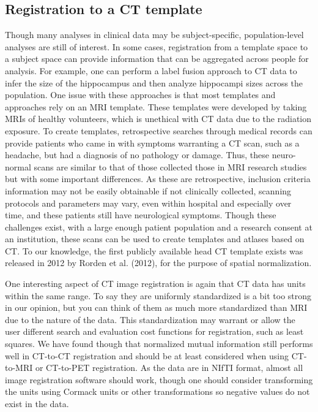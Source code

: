 \documentclass[]{elsarticle} %
\begin{document}
\hypertarget{registration-to-a-ct-template}{%
\subsection{Registration to a CT
template}\label{registration-to-a-ct-template}}

Though many analyses in clinical data may be subject-specific,
population-level analyses are still of interest. In some cases,
registration from a template space to a subject space can provide
information that can be aggregated across people for analysis. For
example, one can perform a label fusion approach to CT data to infer the
size of the hippocampus and then analyze hippocampi sizes across the
population. One issue with these approaches is that most templates and
approaches rely on an MRI template. These templates were developed by
taking MRIs of healthy volunteers, which is unethical with CT data due
to the radiation exposure. To create templates, retrospective searches
through medical records can provide patients who came in with symptoms
warranting a CT scan, such as a headache, but had a diagnosis of no
pathology or damage. Thus, these neuro-normal scans are similar to that
of those collected those in MRI research studies but with some important
differences. As these are retrospective, inclusion criteria information
may not be easily obtainable if not clinically collected, scanning
protocols and parameters may vary, even within hospital and especially
over time, and these patients still have neurological symptoms. Though
these challenges exist, with a large enough patient population and a
research consent at an institution, these scans can be used to create
templates and atlases based on CT. To our knowledge, the first publicly
available head CT template exists was released in 2012 by Rorden et al.
(2012), for the purpose of spatial normalization.

One interesting aspect of CT image registration is again that CT data
has units within the same range. To say they are uniformly standardized
is a bit too strong in our opinion, but you can think of them as much
more standardized than MRI due to the nature of the data. This
standardization may warrant or allow the user different search and
evaluation cost functions for registration, such as least squares. We
have found though that normalized mutual information still performs well
in CT-to-CT registration and should be at least considered when using
CT-to-MRI or CT-to-PET registration. As the data are in NIfTI format,
almost all image registration software should work, though one should
consider transforming the units using Cormack units or other
transformations so negative values do not exist in the data.
\end{document}
